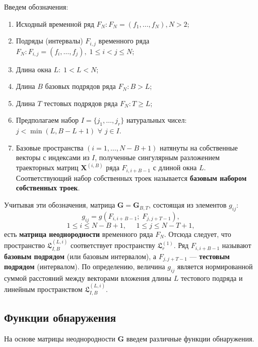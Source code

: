 \documentclass[specialist, substylefile = spbu.rtx,
			   subf, href, 12pt]{disser}
\begin{document}
Введем обозначения:
\begin{enumerate}
	
	\item
	Исходный временной ряд $ F_N: F_N = (f_1, \dotsc, f_{N}), N > 2 $;
	
	\item
	Подряды (интервалы) $ F_{i, j} $ временного ряда $ F_N: F_{i, j} = (f_{i}, \dotsc, f_{j}), \; 1 \leq i < j \leq N $;
	
	\item
	Длина окна $ L: \; 1 < L < N $;
	
	\item
	Длина $ B $ базовых подрядов ряда $ F_N: B > L $;
	
	\item
	Длина $ T $ тестовых подрядов ряда $ F_N: T \geq L $;
	
	\item
	Предполагаем набор $ I = \{j_1, \dotsc, j_r\} $ натуральных чисел: $ j < \min(L, B - L + 1) $ $ \forall $ $ j \in I $.
	
	\item
	Базовые пространства $ (i = 1, \dotsc, N - B + 1) $ натянуты на собственные векторы с индексами из $ I $, полученные сингулярным разложением траекторных матриц $ \mathbf{X}^{(i, B)} $ ряда $ F_{i, i+B-1} $ с длиной окна $ L $. Соответствующий набор собственных троек называется \textbf{базовым набором собственных троек}.
	
\end{enumerate}

Учитывая эти обозначения, матрица $ \mathbf{G} = \mathbf{G}_{B, T} $, состоящая из элементов $g_{ij}$:
\begin{equation} \label{eq:g_elements}
	g_{ij} = g(F_{i, i+B-1};\;F_{j, j+T-1}),
\end{equation}
$$1 \leq i \leq N-B+1,\;\;\;\;\; 1 \leq j \leq N-T+1,$$
есть \textbf{матрица неоднородности} временного ряда $ F_N $. Отсюда следует, что пространство $ \mathfrak{L}_{I, B}^{(L, i)} $ соответствует пространству $ \mathfrak{L}_r^{(1)} $. Ряд $ F_{i, i+B-1} $ называют \textbf{базовым подрядом} (или базовым интервалом), а $ F_{j, j+T-1} $ --- \textbf{тестовым подрядом} (интервалом). По определению, величина $g_{ij}$ является нормированной суммой расстояний между векторами вложения длины $L$ тестового подряда и линейным пространством $ \mathfrak{L}_{I, B}^{(L, i)} $. 

\subsection{Функции обнаружения}
На основе матрицы неоднородности $ \mathbf{G} $ введем различные функции обнаружения.
\end{document}

